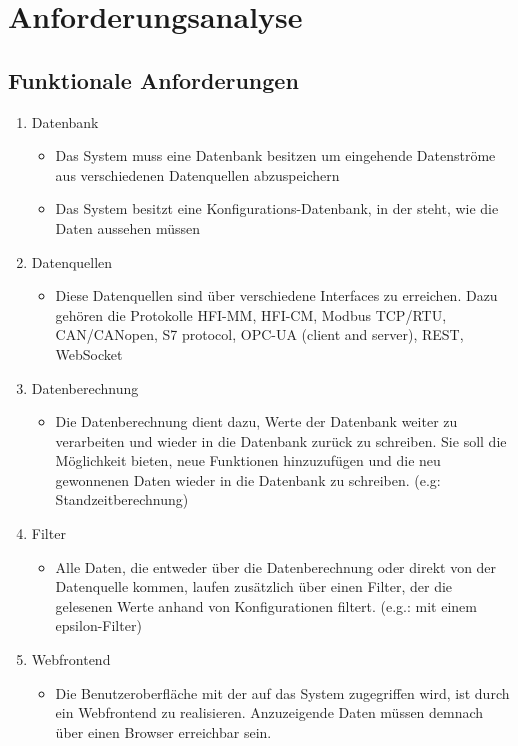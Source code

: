 \chapter{Anforderungsanalyse}
\label{ch:Anforderungsanalyse}
\section{Funktionale Anforderungen}

\begin{enumerate}
    \item Datenbank
    \begin{itemize}
        \item Das System muss eine Datenbank besitzen um eingehende Datenströme aus verschiedenen Datenquellen abzuspeichern
        \item Das System besitzt eine Konfigurations-Datenbank, in der steht, wie die Daten aussehen müssen
    \end{itemize}
    \item Datenquellen
    \begin{itemize}
        \item Diese Datenquellen sind über verschiedene Interfaces zu erreichen. Dazu gehören die Protokolle HFI-MM, HFI-CM, Modbus TCP/RTU, CAN/CANopen, S7 protocol, OPC-UA (client and server), REST, WebSocket
    \end{itemize}
    \item Datenberechnung
    \begin{itemize}
        \item Die Datenberechnung dient dazu, Werte der Datenbank weiter zu verarbeiten und wieder in die Datenbank zurück zu schreiben. Sie soll die Möglichkeit bieten, neue Funktionen hinzuzufügen und die neu gewonnenen Daten wieder in die Datenbank zu schreiben. (e.g: Standzeitberechnung)
    \end{itemize}
    \item Filter
    \begin{itemize}
        \item Alle Daten, die entweder über die Datenberechnung oder direkt von der Datenquelle kommen, laufen zusätzlich über einen Filter, der die gelesenen Werte anhand von Konfigurationen filtert. (e.g.: mit einem epsilon-Filter)
    \end{itemize}
    \item Webfrontend
    \begin{itemize}
        \item Die Benutzeroberfläche mit der auf das System zugegriffen wird, ist durch ein Webfrontend zu realisieren. Anzuzeigende Daten müssen demnach über einen Browser erreichbar sein.

\end{itemize}
\end{enumerate}
